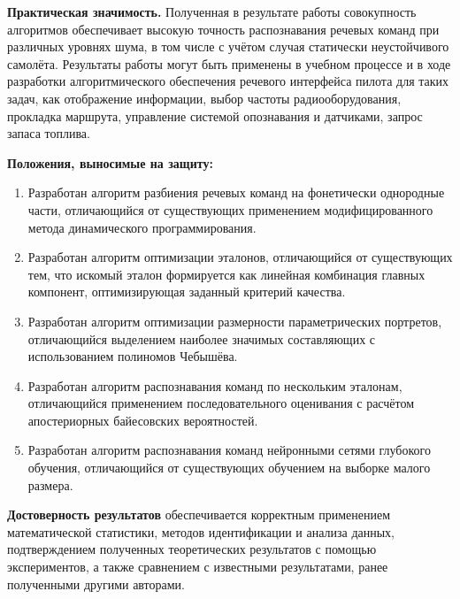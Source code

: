 \textbf{Практическая значимость.}
Полученная в результате работы совокупность алгоритмов обеспечивает высокую точность распознавания речевых команд при различных уровнях шума, в том числе с учётом случая статически неустойчивого самолёта.
Результаты работы могут быть применены в учебном процессе и в ходе разработки алгоритмического обеспечения речевого интерфейса пилота для таких задач, как отображение информации, выбор частоты радиооборудования, прокладка маршрута, управление системой опознавания и датчиками, запрос запаса топлива.

\textbf{Положения, выносимые на защиту:}
\begin{enumerate}[label={\arabic*)}]
	\item Разработан алгоритм разбиения речевых команд на фонетически однородные части, отличающийся от существующих применением модифицированного метода динамического программирования.
	\item Разработан алгоритм оптимизации эталонов, отличающийся от существующих тем, что искомый эталон формируется как линейная комбинация главных компонент, оптимизирующая заданный критерий качества.
	\item Разработан алгоритм оптимизации размерности параметрических портретов, отличающийся выделением наиболее значимых составляющих с использованием полиномов Чебышёва.
	\item Разработан алгоритм распознавания команд по нескольким эталонам, отличающийся применением последовательного оценивания с расчётом апостериорных байесовских вероятностей.
	\item Разработан алгоритм распознавания команд нейронными сетями глубокого обучения, отличающийся от существующих обучением на выборке малого размера.
\end{enumerate}

\textbf{Достоверность результатов} обеспечивается корректным применением математической статистики, методов идентификации и анализа данных, подтверждением полученных теоретических результатов с помощью экспериментов, а также сравнением с известными результатами, ранее полученными другими авторами.

